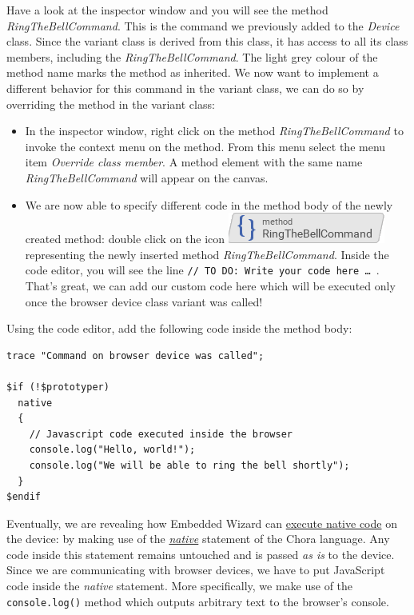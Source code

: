 \documentclass[
  a4paper,
,tablecaptionabove
]{scrbook}
\begin{document}
Have a look at the inspector window and you will see the method
\emph{RingTheBellCommand}. This is the command we previously added to
the \emph{Device} class. Since the variant class is derived from this
class, it has access to all its class members, including the
\emph{RingTheBellCommand}. The light grey colour of the method name
marks the method as inherited. We now want to implement a different
behavior for this command in the variant class, we can do so by
overriding the method in the variant class:

\begin{itemize}
\item
  In the inspector window, right click on the method
  \emph{RingTheBellCommand} to invoke the context menu on the method.
  From this menu select the menu item \emph{Override class member}. A
  method element with the same name \emph{RingTheBellCommand} will
  appear on the canvas.
\item
  We are now able to specify different code in the method body of the
  newly created method: double click on the icon
  \includegraphics{./../asciidoc/modules/ROOT/assets/images/icons/RingTheBellCommandIcon.png}
  representing the newly inserted method \emph{RingTheBellCommand}.
  Inside the code editor, you will see the line
  \texttt{//\ TO\ DO:\ Write\ your\ code\ here\ \ldots{}​\ }. That's
  great, we can add our custom code here which will be executed only
  once the browser device class variant was called!
\end{itemize}

Using the code editor, add the following code inside the method body:

\begin{verbatim}
trace "Command on browser device was called";

$if (!$prototyper)
  native
  {
    // Javascript code executed inside the browser
    console.log("Hello, world!");
    console.log("We will be able to ring the bell shortly");
  }
$endif
\end{verbatim}

Eventually, we are revealing how Embedded Wizard can
\href{https://doc.embedded-wizard.de/integrating-with-the-device\#1}{execute
native code} on the device: by making use of the
\emph{\href{https://doc.embedded-wizard.de/native-statement}{native}}
statement of the Chora language. Any code inside this statement remains
untouched and is passed \emph{as is} to the device. Since we are
communicating with browser devices, we have to put JavaScript code
inside the \emph{native} statement. More specifically, we make use of
the \texttt{console.log()} method which outputs arbitrary text to the
browser's console.
\end{document}
